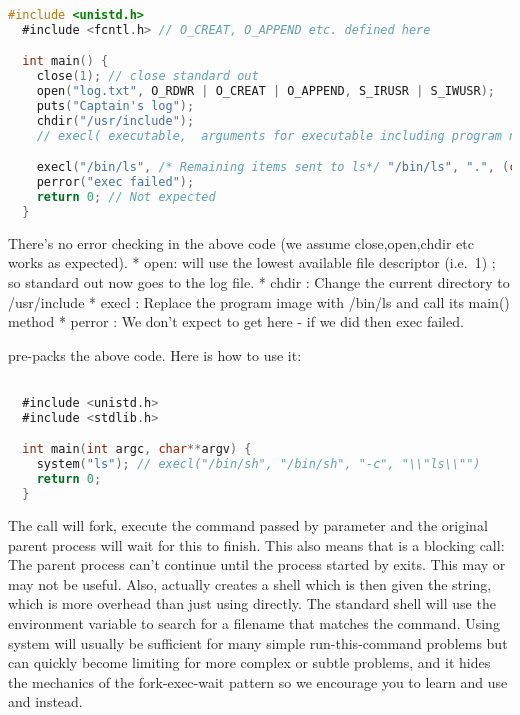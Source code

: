 \begin{lstlisting}[language=C]
  #include <unistd.h>
  #include <fcntl.h> // O_CREAT, O_APPEND etc. defined here

  int main() {
    close(1); // close standard out
    open("log.txt", O_RDWR | O_CREAT | O_APPEND, S_IRUSR | S_IWUSR);
    puts("Captain's log");
    chdir("/usr/include");
    // execl( executable,  arguments for executable including program name and NULL at the end)

    execl("/bin/ls", /* Remaining items sent to ls*/ "/bin/ls", ".", (char *) NULL); // "ls ."
    perror("exec failed");
    return 0; // Not expected
  }
\end{lstlisting}

There's no error checking in the above code (we assume close,open,chdir etc works as expected). * open: will use the lowest available file descriptor (i.e.~1) ; so standard out now goes to the log file. * chdir : Change the current directory to /usr/include * execl : Replace the program image with /bin/ls and call its main() method * perror : We don't expect to get here - if we did then exec failed.

 pre-packs the above code. Here is how to use it:

\begin{lstlisting}[language=C]

  #include <unistd.h>
  #include <stdlib.h>

  int main(int argc, char**argv) {
    system("ls"); // execl("/bin/sh", "/bin/sh", "-c", "\\"ls\\"")
    return 0;
  }
\end{lstlisting}

The  call will fork, execute the command passed by parameter and the original parent process will wait for this to finish. This also means that  is a blocking call: The parent process can't continue until the process started by  exits. This may or may not be useful. Also,  actually creates a shell which is then given the string, which is more overhead than just using  directly. The standard shell will use the  environment variable to search for a filename that matches the command. Using system will usually be sufficient for many simple run-this-command problems but can quickly become limiting for more complex or subtle problems, and it hides the mechanics of the fork-exec-wait pattern so we encourage you to learn and use   and  instead.

